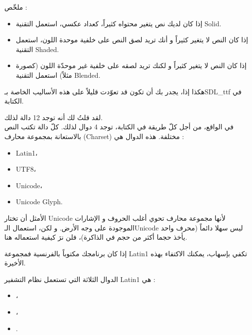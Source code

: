 
ملخّص :

\begin{itemize}
	\item إذا كان لديك نص يتغير محتواه كثيراً، كعداد عكسي، استعمل التقنية 
	\textenglish{Solid}.
	\item إذا كان النص لا يتغير كثيراً و أنك تريد لصق النص على خلفية موحدة اللون، استعمل التقنية 
	\textenglish{Shaded}.
	\item إذا كان النص لا يتغير كثيراً و لكنك تريد لصقه على خلفية غير موحدّة اللون (كصورة مثلاً) استعمل التقنية 
	\textenglish{Blended}.
\end{itemize}

هكذا إذا، يجدر بك أن تكون قد تعوّدت قليلاً على هذه الأساليب الخاصة بـ\textenglish{SDL\_ttf}
في الكتابة.

لقد قلتُ لك أنه توجد 12 دالة لذلك.\\
في الواقع، من أجل كلّ طريقة في الكتابة، توجد 4 دوال لذلك. كلّ دالة تكتب النص بالاستعانة بمجموعة محارف 
(\textenglish{Charset})
مختلفة. هذه الدوال هي :

\begin{itemize}
	\item \textenglish{Latin1}،
	\item \textenglish{UTF8}،
	\item \textenglish{Unicode}،
	\item \textenglish{Unicode Glyph}.
\end{itemize}

الأمثل أن تختار
\textenglish{Unicode}
لأنها مجموعة محارف تحوي أغلب الحروف و الإشارات الموجودة على وجه الأرض. و لكن، استعمال الـ\textenglish{Unicode}
ليس سهلا دائماً (محرف واحد يأخذ حجما أكثر من حجم
في الذاكرة)، فلن نرَ كيفية استعماله هنا.

إذا كان برنامجك مكتوباً بالفرنسية فمجموعة
\textenglish{Latin1}
تكفي بإسهاب، يمكنك الاكتفاء بهذه الأخيرة.

الدوال الثلاثة التي تستعمل نظام التشفير
\textenglish{Latin1}
هي :

\begin{itemize}
	\item {}،
	\item {}،
	\item {}.
\end{itemize}

